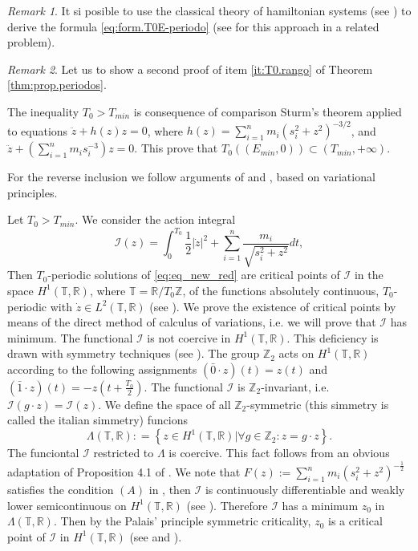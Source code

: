 \documentclass[twoside]{article}
\theoremstyle{remark}
\newtheorem{comentario}{Remark}
\newcommand{\rr}{\mathbb{R}}
\begin{document}
\begin{comentario}
 It si posible to use the classical theory of hamiltonian systems (see \cite{A}) to derive the formula \eqref{eq:form.T0E-periodo} (see \cite{acinas2014estimates} for this approach in a related problem).
\end{comentario}



\begin{comentario}
Let us to show a second proof of item \ref{it:T0.rango} of Theorem \ref{thm:prop.periodos}.

The inequality $T_0>T_{min}$ is consequence of comparison Sturm's theorem applied to equations  $\ddot{z}+h(z)z=0$, where $h(z)=\sum_{i=1}^{n} m_i \left(s_i^2 +z^2\right)^{-3/2}$, and $\ddot{z}+\left(\sum_{i=1}^{n} m_i s_i^{-3}\right)z=0$. This prove that $T_0\left((E_{min},0)\right)\subset(T_{min},+\infty)$.

For the reverse inclusion  we  follow arguments of \cite{zhao2015nonplanar} and \cite{li2013characterization}, based on variational principles.


Let $T_0>T_{min}$. We consider the action integral
\[\mathcal{I}(z)=\int_0^{T_0}\frac12|\dot{z}|^2+\sum_{i=1}^n\frac{m_i}{\sqrt{s_i^2+z^2}}dt,\]
Then $T_0$-periodic solutions of \eqref{eq:eq_new_red} are critical points of $\mathcal{I}$ in the space $H^1(\mathbb{T},\rr)$, where $\mathbb{T}=\rr/T_0\mathbb{Z}$, of the functions  absolutely continuous, $T_0$-periodic with $\dot{z}\in L^2(\mathbb{T},\rr)$ (see \cite[Cor. 1.1]{Mawhin2010}). We prove the existence of critical points by means of the direct method of calculus of variations, i.e. we will prove that $\mathcal{I}$ has minimum.  The functional $\mathcal{I}$ is not coercive in $H^1(\mathbb{T},\rr)$.  This deficiency is drawn with symmetry techniques (see \cite{David-2004}). The group $\mathbb{Z}_2$ acts on $H^1(\mathbb{T},\rr)$ according to the following assignments $(\bar{0}\cdot z)(t)=z(t)$ and $(\bar{1}\cdot z)(t)=-z(t+\frac{T_0}{2})$. The functional $\mathcal{I}$ is $\mathbb{Z}_2$-invariant, i.e. $\mathcal{I}(g\cdot z)=\mathcal{I}(z)$. We define the space of all $\mathbb{Z}_2$-symmetric (this simmetry is called the italian simmetry) funcions \[\Lambda(\mathbb{T},\mathbb{R}):
=\left\{ z\in H^1(\mathbb{T},\rr) | \forall g\in \mathbb{Z}_2 : z=g\cdot z \right\}.\]
The funciontal $\mathcal{I}$ restricted to $\Lambda$  is coercive. This fact follows from an obvious adaptation of Proposition 4.1 of \cite{David-2004}. We note that $F(z):=\sum_{i=1}^nm_i(s_i^2+z^2)^{-\frac{1}{2}}$ satisfies the condition $(A)$ in \cite[p. 12]{Mawhin2010}, then $\mathcal{I}$  is continuously differentiable and weakly lower semicontinuous on $H^1(\mathbb{T},\rr)$ (see \cite[p. 13]{Mawhin2010}). Therefore $\mathcal{I}$ has a minimum $z_0$ in $\Lambda(\mathbb{T},\mathbb{R})$. Then by the Palais' principle symmetric criticality,  $z_0$ is a critical point of $\mathcal{I}$ in $H^1(\mathbb{T},\rr)$ (see \cite{David-2004} and \cite{RichardPalais274}).


\end{comentario}
\end{document}
